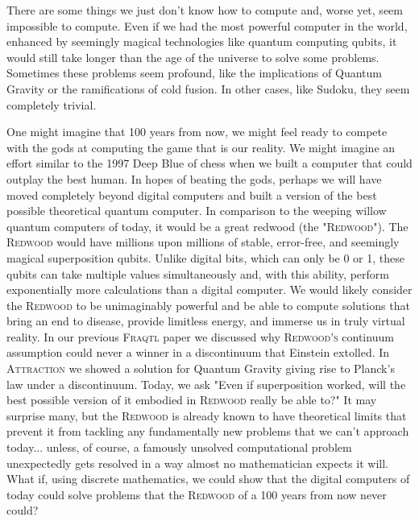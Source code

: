 \documentclass{report}
\begin{document}
There are some things we just don't know how to compute and, worse yet, seem impossible to compute. Even if we had the most powerful computer in the world, enhanced by seemingly magical technologies like quantum computing qubits, it would still take longer than the age of the universe to solve some problems. Sometimes these problems seem profound, like the implications of Quantum Gravity or the ramifications of cold fusion. In other cases, like Sudoku, they seem completely trivial.

One might imagine that 100 years from now, we might feel ready to compete with the gods at computing the game that is our reality. We might imagine an effort similar to the 1997 Deep Blue of chess when we built a computer that could outplay the best human. In hopes of beating the gods, perhaps we will have moved completely beyond digital computers and built a version of the best possible theoretical quantum computer. In comparison to the weeping willow quantum computers of today, it would be a great redwood (the "\textsc{Redwood}"). The \textsc{Redwood} would have millions upon millions of stable, error-free, and seemingly magical superposition qubits. Unlike digital bits, which can only be 0 or 1, these qubits can take multiple values simultaneously and, with this ability, perform exponentially more calculations than a digital computer. We would likely consider the \textsc{Redwood} to be unimaginably powerful and be able to compute solutions that bring an end to disease, provide limitless energy, and immerse us in truly virtual reality. In our previous \textsc{Fraqtl} paper we discussed why \textsc{Redwood's} continuum assumption could never a winner in a discontinuum that Einstein extolled. In \textsc{Attraction} we showed a solution for Quantum Gravity giving rise to Planck's law under a discontinuum. Today, we ask "Even if superposition worked, will the best possible version of it embodied in \textsc{Redwood} really be able to?" It may surprise many, but the \textsc{Redwood} is already known to have theoretical limits that prevent it from tackling any fundamentally new problems that we can't approach today\cite{Bennett1997}... unless, of course, a famously unsolved computational problem unexpectedly gets resolved in a way almost no mathematician expects it will\cite{50yearsofPvsNP}. What if, using discrete mathematics, we could show that the digital computers of today could solve problems that the \textsc{Redwood} of a 100 years from now never could?
\end{document}
